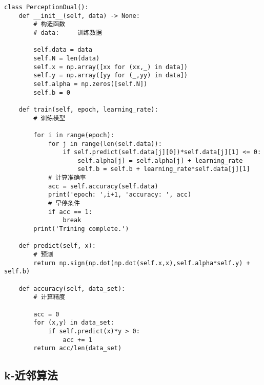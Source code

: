 \begin{lstlisting}[caption = 感知机对偶算法实现]
	class PerceptionDual():
    def __init__(self, data) -> None:
        # 构造函数
        # data:     训练数据
        
        self.data = data
        self.N = len(data)
        self.x = np.array([xx for (xx,_) in data])
        self.y = np.array([yy for (_,yy) in data])
        self.alpha = np.zeros([self.N])
        self.b = 0
    
    def train(self, epoch, learning_rate):
        # 训练模型
        
        for i in range(epoch):
            for j in range(len(self.data)):
                if self.predict(self.data[j][0])*self.data[j][1] <= 0:
                    self.alpha[j] = self.alpha[j] + learning_rate
                    self.b = self.b + learning_rate*self.data[j][1]
            # 计算准确率
            acc = self.accuracy(self.data)
            print('epoch: ',i+1, 'accuracy: ', acc)
            # 早停条件
            if acc == 1:
                break
        print('Trining complete.')

    def predict(self, x):
        # 预测
        return np.sign(np.dot(np.dot(self.x,x),self.alpha*self.y) + self.b)
    
    def accuracy(self, data_set):
        # 计算精度

        acc = 0
        for (x,y) in data_set:
            if self.predict(x)*y > 0:
                acc += 1
        return acc/len(data_set)
\end{lstlisting}

\subsection{k-近邻算法}

